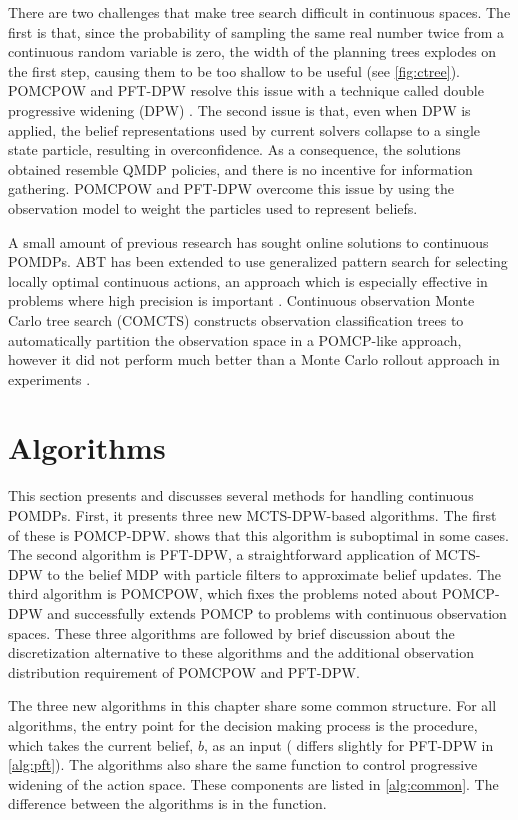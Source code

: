 There are two challenges that make tree search difficult in continuous spaces.
The first is that, since the probability of sampling the same real number twice from a continuous random variable is zero, the width of the planning trees explodes on the first step, causing them to be too shallow to be useful (see \cref{fig:ctree}).
POMCPOW and PFT-DPW resolve this issue with a technique called double progressive widening (DPW) \cite{couetoux2011double}. 
The second issue is that, even when DPW is applied, the belief representations used by current solvers collapse to a single state particle, resulting in overconfidence.
As a consequence, the solutions obtained resemble QMDP policies, and there is no incentive for information gathering.
POMCPOW and PFT-DPW overcome this issue by using the observation model to weight the particles used to represent beliefs.

A small amount of previous research has sought online solutions to continuous POMDPs.
ABT has been extended to use generalized pattern search for selecting locally optimal continuous actions, an approach which is especially effective in problems where high precision is important \cite{seiler2015online,wang2018online}.
Continuous observation Monte Carlo tree search (COMCTS) constructs observation classification trees to automatically partition the observation space in a POMCP-like approach, however it did not perform much better than a Monte Carlo rollout approach in experiments \cite{pas2012simulation}.

\section{Algorithms}

This section presents and discusses several methods for handling continuous POMDPs.
First, it presents three new MCTS-DPW-based algorithms.
The first of these is POMCP-DPW.
 shows that this algorithm is suboptimal in some cases.
The second algorithm is PFT-DPW, a straightforward application of MCTS-DPW to the belief MDP with particle filters to approximate belief updates.
The third algorithm is POMCPOW, which fixes the problems noted about POMCP-DPW and successfully extends POMCP to problems with continuous observation spaces.
These three algorithms are followed by brief discussion about the discretization alternative to these algorithms and the additional observation distribution requirement of POMCPOW and PFT-DPW.

The three new algorithms in this chapter share some common structure.
For all algorithms, the entry point for the decision making process is the  procedure, which takes the current belief, $b$, as an input ( differs slightly for PFT-DPW in \cref{alg:pft}).
The algorithms also share the same  function to control progressive widening of the action space.
These components are listed in \cref{alg:common}.
The difference between the algorithms is in the  function.

